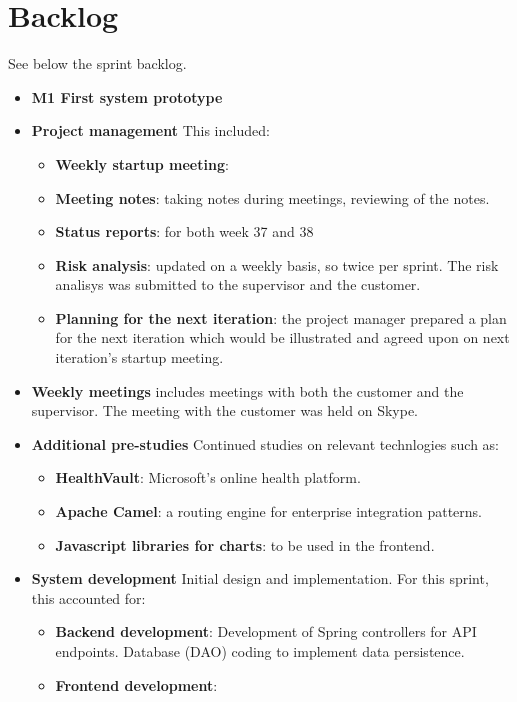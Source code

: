 \section{Backlog}

See below the sprint backlog.
\begin{itemize}
	\item \textbf{M1 First system prototype}
	\item \textbf{Project management}\newline
	This included:
	\begin{itemize}
		\item \textbf{Weekly startup meeting}: 
		\item \textbf{Meeting notes}:
			taking notes during meetings, reviewing of the notes.
		\item \textbf{Status reports}:
			for both week 37 and 38
		\item \textbf{Risk analysis}:
			updated on a weekly basis, so twice per sprint.
			The risk analisys was submitted to the supervisor and the customer.
		\item \textbf{Planning for the next iteration}:
			the project manager prepared a plan for the next iteration
			which would be illustrated and agreed upon on next iteration's startup meeting.
	\end{itemize}
	\item \textbf{Weekly meetings}
		includes meetings with both the customer and the supervisor.
		The meeting with the customer was held on Skype.
	\item \textbf{Additional pre-studies}
		Continued studies on relevant technlogies such as:
	\begin{itemize}
		\item \textbf{HealthVault}: Microsoft's online health platform.
		\item \textbf{Apache Camel}: a routing engine for enterprise integration patterns.
		\item \textbf{Javascript libraries for charts}: to be used in the frontend.
	\end{itemize}
	\item \textbf{System development}
		Initial design and implementation. For this sprint, this accounted for:
	\begin{itemize}
		\item \textbf{Backend development}:
			Development of Spring controllers for API endpoints. Database (DAO) coding to
			implement data persistence.
		\item \textbf{Frontend development}:

\end{itemize}
\end{itemize}
